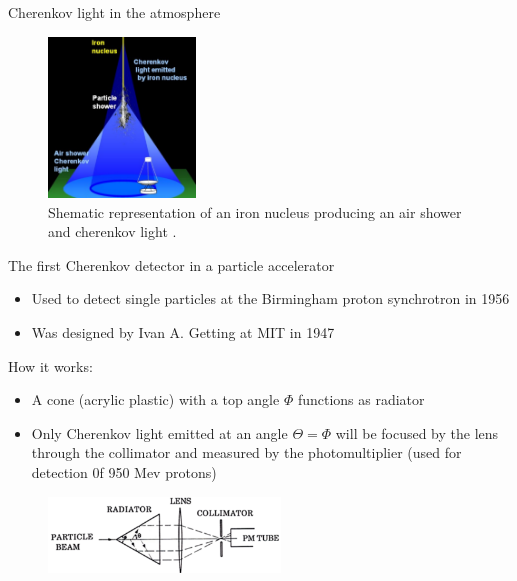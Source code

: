 \documentclass[aspectratio=1610, 10pt]{beamer}
\begin{document}

\begin{frame}{Cherenkov light in the atmosphere}
  \begin{figure}
    \includegraphics[width=0.35\textwidth]{images/cherenkov_cone.png}
    \caption{Shematic representation of an iron nucleus producing an air shower and cherenkov light \cite{hess}.}
  \end{figure}
\end{frame}

\begin{frame}{The first Cherenkov detector in a particle accelerator}
  \begin{itemize}
    \item Used to detect single particles at the Birmingham proton synchrotron in 1956
    \medskip
    \item Was designed by Ivan A. Getting at MIT in 1947
  \end{itemize}

How it works:
\begin{itemize}
  \item A cone (acrylic plastic) with a top angle $\Phi$ functions as radiator
  \medskip
  \item Only Cherenkov light emitted at an angle $\Theta = \Phi$ will be focused by the lens through the collimator and measured by the
  photomultiplier (used for detection 0f 950 Mev protons)
\end{itemize}
\begin{figure}
  \includegraphics[width=0.55\textwidth]{images/the_second.png}
\end{figure}
\end{frame}
\end{document}
